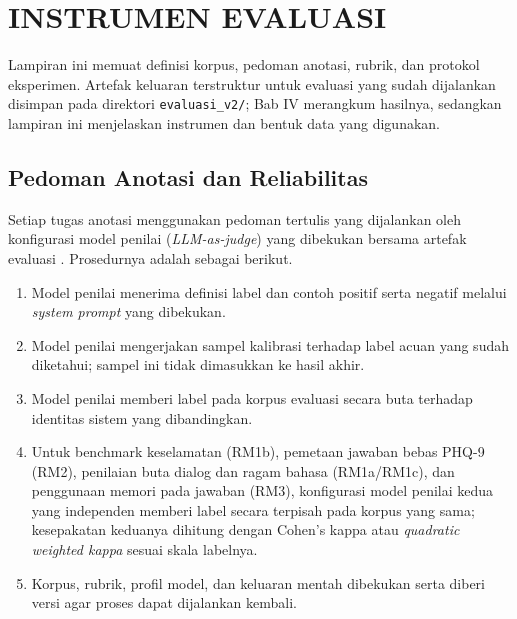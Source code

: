 \chapter{INSTRUMEN EVALUASI}
\label{lamp:v2-evaluation}

Lampiran ini memuat definisi korpus, pedoman anotasi, rubrik, dan protokol eksperimen. Artefak keluaran terstruktur untuk evaluasi yang sudah dijalankan disimpan pada direktori \texttt{evaluasi\_v2/}; Bab IV merangkum hasilnya, sedangkan lampiran ini menjelaskan instrumen dan bentuk data yang digunakan.

\section{Pedoman Anotasi dan Reliabilitas}
\label{lamp:v2-annotation}

Setiap tugas anotasi menggunakan pedoman tertulis yang dijalankan oleh konfigurasi model penilai (\textit{LLM-as-judge}) yang dibekukan bersama artefak evaluasi \parencite{liu2023geval,zheng2023judging}. Prosedurnya adalah sebagai berikut.

\begin{enumerate}[label=\arabic*.,leftmargin=*,itemsep=3pt]
  \item Model penilai menerima definisi label dan contoh positif serta negatif melalui \textit{system prompt} yang dibekukan.
  \item Model penilai mengerjakan sampel kalibrasi terhadap label acuan yang sudah diketahui; sampel ini tidak dimasukkan ke hasil akhir.
  \item Model penilai memberi label pada korpus evaluasi secara buta terhadap identitas sistem yang dibandingkan.
  \item Untuk benchmark keselamatan (RM1b), pemetaan jawaban bebas PHQ-9 (RM2), penilaian buta dialog dan ragam bahasa (RM1a/RM1c), dan penggunaan memori pada jawaban (RM3), konfigurasi model penilai kedua yang independen memberi label secara terpisah pada korpus yang sama; kesepakatan keduanya dihitung dengan Cohen's kappa atau \textit{quadratic weighted kappa} sesuai skala labelnya.
  \item Korpus, rubrik, profil model, dan keluaran mentah dibekukan serta diberi versi agar proses dapat dijalankan kembali.
\end{enumerate}

